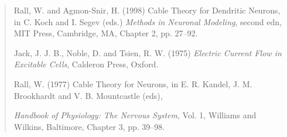 \documentclass[12pt]{article}
\begin{document}
\begin{quote}
Rall, W. and Agmon-Snir, H. (1998) Cable Theory for Dendritic Neurons, in C. Koch and I. Segev (eds.) {\it Methods in Neuronal Modeling}, second edn, MIT Press, Cambridge, MA, Chapter 2, pp. 27--92.

Jack, J. J. B., Noble, D. and Tsien, R. W. (1975) {\it Electric Current Flow in Excitable Cells}, Calderon Press, Oxford.

Rall, W. (1977) Cable Theory for Neurons, in E. R. Kandel, J. M. Brookhardt and V. B. Mountcastle (eds), 

{\it Handbook of Physiology: The Nervous System}, Vol. 1, Williams and Wilkins, Baltimore, Chapter 3, pp. 39--98.
\end{quote}
\end{document}
